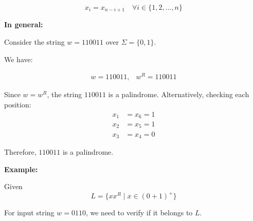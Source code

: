 \documentclass[12pt,a4paper,openany]{article}
\begin{document}
\[
x_i = x_{n-i+1} \quad \forall i \in \{1, 2, \ldots, n\}
\]

\textbf{In general:}

Consider the string $w = 110011$ over $\Sigma = \{0, 1\}$.

We have:

\[
\begin{array}{ll}
w = 110011, & w^R = 110011
\end{array}
\]

Since $w = w^R$, the string $110011$ is a palindrome. Alternatively, checking each position:
\begin{align*}
x_1 &= x_6 = 1 \\
x_2 &= x_5 = 1 \\
x_3 &= x_4 = 0
\end{align*}

Therefore, $110011$ is a palindrome.

\textbf{Example:}

Given \[L = \{xx^R \mid x \in (0+1)^+\}\]

For input string $w = 0110$, we need to verify if it belongs to $L$.
\end{document}
